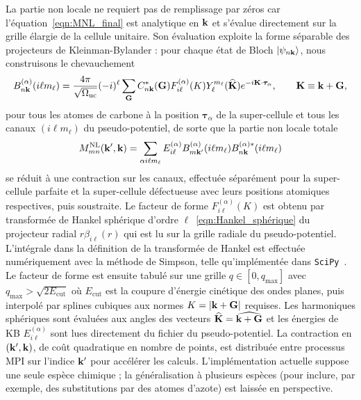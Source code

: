 \bigskip
{}

La partie non locale ne requiert pas de remplissage par zéros car l'équation~\eqref{eqn:MNL_final} est analytique en $\mathbf{k}$ et s'évalue directement sur la grille élargie de la cellule unitaire. Son évaluation exploite la forme séparable des projecteurs de Kleinman-Bylander : pour chaque état de Bloch $\ket{\psi_{n\mathbf{k}}}$, nous construisons le chevauchement
\begin{equation}
    B_{n\mathbf{k}}^{(\alpha)}(i\ell m_\ell) = \frac{4\pi}{\sqrt{\Omega_\text{uc}}}(-i)^\ell\sum_{\mathbf{G}}C^*_{n\mathbf{k}} (\mathbf{G}) F_{i\ell}^{(\alpha)}(K)Y_\ell^{m_\ell}(\widehat{\mathbf{K}})e^{-i\mathbf{K}\cdot\bm\tau_\alpha},\qquad \mathbf{K}\equiv \mathbf{k}+\mathbf{G},
\end{equation}
pour tous les atomes de carbone à la position $\bm\tau_\alpha$ de la super-cellule et tous les canaux $(i\ell m_\ell)$ du pseudo-potentiel, de sorte que la partie non locale totale
\begin{equation}
M^\text{NL}_{mn}(\mathbf{k}',\mathbf{k})=\sum_{\alpha i\ell m_\ell}E_{i\ell}^{(\alpha)}B_{m\mathbf{k}'}^{(\alpha)}(i\ell m_\ell) B^{(\alpha)*}_{n\mathbf{k}}(i\ell m_\ell)\label{eqn:MNL_detail}
\end{equation}
se réduit à une contraction sur les canaux, effectuée séparément pour la super-cellule parfaite et la super-cellule défectueuse avec leurs positions atomiques respectives, puis soustraite. Le facteur de forme $F_{i\ell}^{(\alpha)}(K)$ est obtenu par transformée de Hankel sphérique d'ordre $\ell$~\eqref{eqn:Hankel_sphérique} du projecteur radial $r\beta_{i\ell}(r)$ qui est lu sur la grille radiale du pseudo-potentiel. L'intégrale dans la définition de la transformée de Hankel est effectuée numériquement avec la méthode de Simpson, telle qu'implémentée dans \texttt{SciPy}~\cite{virtanenSciPy10Fundamental2020}. Le facteur de forme est ensuite tabulé sur une grille $q\in[0,q_\text{max}]$ avec $q_\text{max}>\sqrt{2E_\text{cut}}$ où $E_\text{cut}$ est la coupure d'énergie cinétique des ondes planes, puis interpolé par splines cubiques aux normes $K=|\mathbf{k}+\mathbf{G}|$ requises. Les harmoniques sphériques sont évaluées aux angles des vecteurs $\widehat{\mathbf{K}} =\widehat{\mathbf{k}+\mathbf{G}}$ et les énergies de KB $E_{i\ell}^{(\alpha)}$ sont lues directement du fichier du pseudo-potentiel. La contraction en $(\mathbf{k}',\mathbf{k})$, de coût quadratique en nombre de points, est distribuée entre processus MPI sur l'indice $\mathbf{k}'$ pour accélérer les calculs. L'implémentation actuelle suppose une seule espèce chimique ; la généralisation à plusieurs espèces (pour inclure, par exemple, des substitutions par des atomes d'azote) est laissée en perspective.

